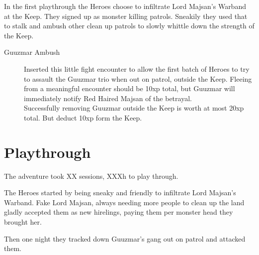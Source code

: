\noindent
In the first playthrough the Heroes choose to infiltrate Lord Majsan's Warband at the Keep. They signed up as monster killing patrols. Sneakily they used that to stalk and ambush other clean up patrols to slowly whittle down the strength of the Keep.

\begin{description}

\item[Guuzmar Ambush] Inserted this little fight encounter to allow the first batch of Heroes to try to assault the Guuzmar trio when out on patrol, outside the Keep.
Fleeing from a meaningful encounter should be 10xp total, but Guuzmar will immediately notify Red Haired Majsan of the betrayal.\\
Successfully removing Guuzmar outside the Keep is worth at most 20xp total. But deduct 10xp form the Keep.

\end{description}


















\clearpage
{}
\section*{Playthrough}

The adventure took XX sessions, XXXh to play through.








The Heroes started by being sneaky and friendly to infiltrate Lord Majsan's Warband. Fake Lord Majsan, always needing more people to clean up the land gladly accepted them as new hirelings, paying them per monster head they brought her.

Then one night they tracked down Guuzmar's gang out on patrol and attacked them.











